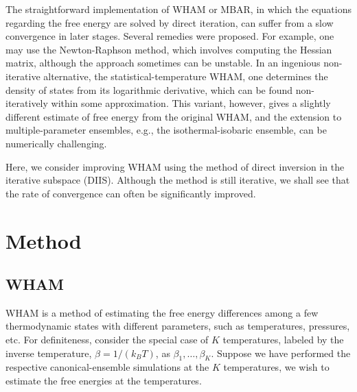\documentclass[reprint,superscriptaddress]{revtex4-1}
\begin{document}
The straightforward implementation of WHAM or MBAR,
in which the equations regarding the free energy
are solved by direct iteration,
can suffer from
a slow convergence in later stages.
%
Several remedies were proposed\cite{
shirts2008, bereau2009, kim2011}.
%
For example, one may use the Newton-Raphson method,
which involves computing the Hessian matrix,
although the approach sometimes can be unstable\cite{
shirts2008}.
%
In an ingenious non-iterative alternative,
the statistical-temperature WHAM,
one determines the density of states
from its logarithmic derivative,
which can be found non-iteratively
within some approximation\cite{
kim2011}.
%
This variant, however, gives
a slightly different estimate of free energy
from the original WHAM,
and the extension to multiple-parameter ensembles,
e.g., the isothermal-isobaric ensemble,
can be numerically challenging\cite{kim2011}.



Here, we consider improving WHAM using
the method of direct inversion in the iterative subspace (DIIS)\cite{
pulay1980, *pulay1982, *hamilton1986,
kovalenko1999, howard2011}.
%
Although the method is still iterative,
we shall see that
the rate of convergence can often be
significantly improved.





\section{Method}





\subsection{WHAM}



WHAM is a method of
estimating the free energy differences
among a few thermodynamic states
with different parameters,
such as temperatures, pressures, etc.
%
For definiteness,
consider the special case of $K$ temperatures,
labeled by the inverse temperature,
$\beta = 1/(k_B T)$,
as
$\beta_1, \ldots, \beta_K$.
%
Suppose we have performed the respective
canonical-ensemble simulations
at the $K$ temperatures,
we wish to estimate the free energies
at the temperatures.
\end{document}
